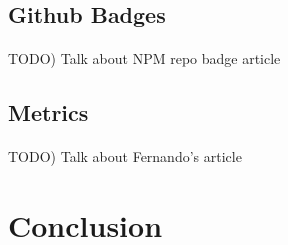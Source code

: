 \documentclass[12pt]{article}
\begin{document}
\subsection{Github Badges}
\paragraph{}
TODO) Talk about NPM repo badge article


\subsection{Metrics}
\paragraph{}
TODO) Talk about Fernando's article

\newpage 
\section{Conclusion}


\newpage


\end{document}
